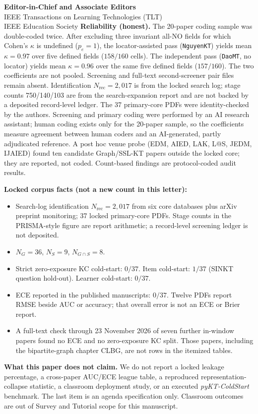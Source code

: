 \documentclass[11pt]{letter}
\begin{document}
\begin{letter}{
\textbf{Editor-in-Chief and Associate Editors}\\
IEEE Transactions on Learning Technologies (TLT)\\
IEEE Education Society
}
\textbf{Reliability (honest).} The 20-paper coding sample was double-coded twice. After excluding three invariant all-NO fields for which Cohen's $\kappa$ is undefined ($p_e=1$), the locator-assisted pass (\texttt{NguyenKT}) yields mean $\kappa=0.97$ over five defined fields ($158/160$ cells). The independent pass (\texttt{DaoMT}, no locator) yields mean $\kappa=0.96$ over the same five defined fields ($157/160$). The two coefficients are not pooled. Screening and full-text second-screener pair files remain absent. Identification $N_{\mathrm{rec}}=2{,}017$ is from the locked search log; stage counts 750/140/103 are from the search-expansion report and are not backed by a deposited record-level ledger. The 37 primary-core PDFs were identity-checked by the authors. Screening and primary coding were performed by an AI research assistant; human coding exists only for the 20-paper sample, so the coefficients measure agreement between human coders and an AI-generated, partly adjudicated reference. A post hoc venue probe (EDM, AIED, LAK, L@S, JEDM, IJAIED) found ten candidate Graph/SSL-KT papers outside the locked core; they are reported, not coded. Count-based findings are protocol-coded audit results.

\textbf{Locked corpus facts (not a new count in this letter):}
\begin{itemize}
    \item Search-log identification $N_{\mathrm{rec}}=2{,}017$ from six core databases plus arXiv preprint monitoring; 37 locked primary-core PDFs. Stage counts in the PRISMA-style figure are report arithmetic; a record-level screening ledger is not deposited.
    \item $N_G=36$, $N_S=9$, $N_{G\cap S}=8$.
    \item Strict zero-exposure KC cold-start: $0/37$. Item cold-start: $1/37$ (SINKT question hold-out). Learner cold-start: $0/37$.
    \item ECE reported in the published manuscripts: $0/37$. Twelve PDFs report RMSE beside AUC or accuracy; that overall error is not an ECE or Brier report.
    \item A full-text check through 23 November 2026 of seven further in-window papers found no ECE and no zero-exposure KC split. Those papers, including the bipartite-graph chapter CLBG, are not rows in the itemized tables.
\end{itemize}

\textbf{What this paper does not claim.} We do not report a locked leakage percentage, a cross-paper AUC/ECE league table, a reproduced representation-collapse statistic, a classroom deployment study, or an executed \emph{pyKT-ColdStart} benchmark. The last item is an agenda specification only. Classroom outcomes are out of Survey and Tutorial scope for this manuscript.


\end{letter}
\end{document}
